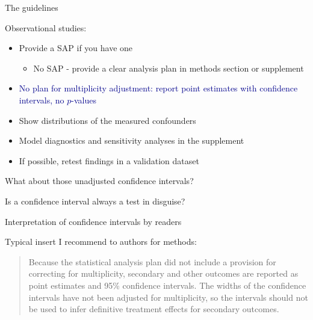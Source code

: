 \documentclass[ignorenonframetext,]{beamer}
\providecommand{\tightlist}{%
  \setlength{\itemsep}{0pt}\setlength{\parskip}{0pt}}
\begin{document}
\begin{frame}{The guidelines}
\protect\hypertarget{the-guidelines-1}{}

Observational studies:

\begin{itemize}
\item
  Provide a SAP if you have one

  \begin{itemize}
  \tightlist
  \item
    No SAP - provide a clear analysis plan in methods section or
    supplement
  \end{itemize}
\item
  \textcolor{darkblue}{No plan for multiplicity adjustment: report point estimates with confidence intervals, no $p$-values}
\item
  Show distributions of the measured confounders
\item
  Model diagnostics and sensitivity analyses in the supplement
\item
  If possible, retest findings in a validation dataset
\end{itemize}

\end{frame}

\begin{frame}{What about those unadjusted confidence intervals?}
\protect\hypertarget{what-about-those-unadjusted-confidence-intervals}{}

Is a confidence interval always a test in disguise?

Interpretation of confidence intervals by readers

Typical insert I recommend to authors for methods:

\begin{quote}
Because the statistical analysis plan did not include a provision for correcting for multiplicity, secondary and other outcomes are reported as point estimates and 95\% confidence intervals. The widths of the confidence intervals have not been adjusted for multiplicity, so the intervals should not be used to infer definitive treatment effects for secondary outcomes.

\end{quote}

\end{frame}
\end{document}
